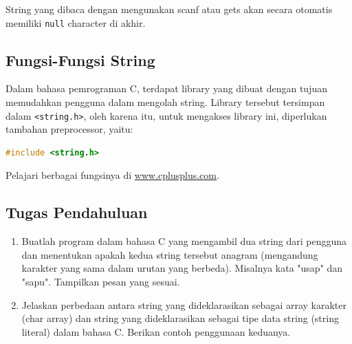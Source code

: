 String yang dibaca dengan mengunakan scanf atau gets akan secara otomatis memiliki \verb|null| character di akhir.

\subsection{Fungsi-Fungsi String}
Dalam bahasa pemrograman C, terdapat library yang dibuat dengan tujuan memudahkan pengguna dalam mengolah string.
Library tersebut tersimpan dalam \verb|<string.h>|,
oleh karena itu, untuk mengakses library ini, diperlukan tambahan preprocessor, yaitu:
\begin{lstlisting}[language=c]
	#include <string.h>
\end{lstlisting}

Pelajari berbagai fungsinya di \href{http://www.cplusplus.com/}{www.cplusplus.com}.

\subsection{Tugas Pendahuluan}
\begin{enumerate}
	\item Buatlah program dalam bahasa C yang mengambil dua string dari pengguna dan menentukan apakah kedua string tersebut anagram (mengandung karakter yang sama dalam urutan yang berbeda).
		  Misalnya kata "usap" dan "sapu".
	      Tampilkan pesan yang sesuai.
	\item Jelaskan perbedaan antara string yang dideklarasikan sebagai array karakter (char array) dan string yang dideklarasikan sebagai tipe data string (string literal) dalam bahasa C. Berikan contoh penggunaan keduanya.
\end{enumerate}